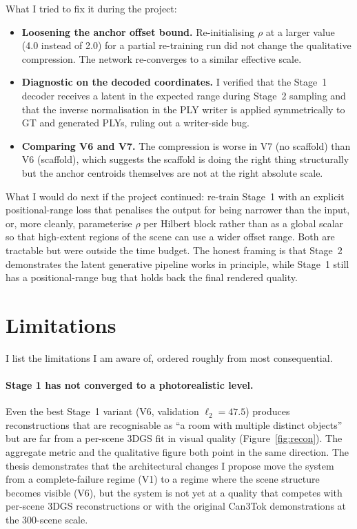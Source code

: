 What I tried to fix it during the project:
\begin{itemize}
\item \textbf{Loosening the anchor offset bound.} Re-initialising $\rho$ at a larger value (4.0 instead of 2.0) for a partial re-training run did not change the qualitative compression. The network re-converges to a similar effective scale.
\item \textbf{Diagnostic on the decoded coordinates.} I verified that the Stage~1 decoder receives a latent in the expected range during Stage~2 sampling and that the inverse normalisation in the PLY writer is applied symmetrically to GT and generated PLYs, ruling out a writer-side bug.
\item \textbf{Comparing V6 and V7.} The compression is worse in V7 (no scaffold) than V6 (scaffold), which suggests the scaffold is doing the right thing structurally but the anchor centroids themselves are not at the right absolute scale.
\end{itemize}

What I would do next if the project continued: re-train Stage~1 with an explicit positional-range loss that penalises the output for being narrower than the input, or, more cleanly, parameterise $\rho$ per Hilbert block rather than as a global scalar so that high-extent regions of the scene can use a wider offset range. Both are tractable but were outside the time budget. The honest framing is that Stage~2 demonstrates the latent generative pipeline works in principle, while Stage~1 still has a positional-range bug that holds back the final rendered quality.

\section{Limitations}
\label{sec:disc_limitations}

I list the limitations I am aware of, ordered roughly from most consequential.

\paragraph{Stage 1 has not converged to a photorealistic level.} Even the best Stage~1 variant (V6, validation $\ell_2 = 47.5$) produces reconstructions that are recognisable as ``a room with multiple distinct objects'' but are far from a per-scene 3DGS fit in visual quality (Figure~\ref{fig:recon}). The aggregate metric and the qualitative figure both point in the same direction. The thesis demonstrates that the architectural changes I propose move the system from a complete-failure regime (V1) to a regime where the scene structure becomes visible (V6), but the system is not yet at a quality that competes with per-scene 3DGS reconstructions or with the original Can3Tok demonstrations at the 300-scene scale.

